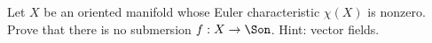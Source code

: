 Let $X$ be an oriented manifold whose Euler characteristic $\chi(X)$
is nonzero. Prove that there is no submersion $f:X\rightarrow
\Son$. Hint: vector fields.
